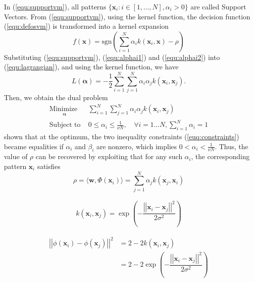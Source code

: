 \documentclass[conference]{IEEEtran}
\theoremstyle{problemstyle}
\begin{document}
In (\ref{equ:supportvm}), all patterns $\{\mathbf{x}_i:i\in[1,\ldots,N], \alpha_i>0\}$ are called Support Vectors. From (\ref{equ:supportvm}), using the kernel function, the decision function (\ref{equ:defosvm}) is transformed into a kernel expansion 
\begin{equation}
\label{equ:defosvmker}
f(\mathbf{x})=\text{sgn}\left(\sum_{i=1}^N\alpha_i k(\mathbf{x}_i, \mathbf{x})- \rho\right)
\end{equation}
Substituting (\ref{equ:supportvm}), (\ref{equ:alphai1}) and (\ref{equ:alphai2}) into (\ref{equ:lagrangian}), and using the kernel function, we have 
\begin{equation}
\label{equ:lagrangianalpha}
L(\boldsymbol{\alpha})=-\frac{1}{2}\sum_{i=1}^N\sum_{j=1}^N \alpha_i\alpha_j k(\mathbf{x}_i, \mathbf{x}_j).
\end{equation}
Then, we obtain the dual problem
\begin{subequations}\label{euq:ocsvmker}
\begin{align}
\underset{
	\begin{array}{c}
		 \mathbf{\alpha}
	\end{array}}{\text{Minimize }} & \sum_{i=1}^N\sum_{j=1}^N \alpha_i\alpha_j k(\mathbf{x}_i, \mathbf{x}_j)\\
\text{Subject to } & 0\leq \alpha_i\leq \frac{1}{\nu N}, \quad \forall i=1\ldots N, \sum_{i=1}^N\alpha_i=1 
\end{align}
\end{subequations}
\cite{scholkopf2001estimating} shown that at the optimum, the two inequality constraints (\ref{euq:constraints}) 
became equalities if $\alpha_i$ and $\beta_i$ are nonzero, which implies $0<\alpha_i<\frac{1}{\nu N}$. Thus, the value of $\rho$
can be recovered by exploiting that for any such $\alpha_i$, the corresponding pattern $ \mathbf{x}_i$ satisfies
\begin{equation}
\label{equ:rho}
\rho=\langle\mathbf{w},\Phi(\mathbf{x}_i)\rangle=\sum_{j=1}^N\alpha_j k(\mathbf{x}_j, \mathbf{x}_i)
\end{equation}

\begin{align}
k \left( \mathbf{x}_i, \mathbf{x}_j\right) = \exp \left( - \dfrac{\left|\left| \mathbf{x}_i - \mathbf{x}_j \right|\right|^2}{2 \sigma^2} \right)
\end{align}

\begin{align}
\left|\left| \phi \left( \mathbf{x}_i \right) - \phi \left( \mathbf{x}_j \right) \right|\right|^2 &= 2 -2 k \left( \mathbf{x}_i, \mathbf{x}_j\right) \nonumber \\
&= 2 - 2 \exp \left( - \dfrac{\left|\left| \mathbf{x}_i - \mathbf{x}_j \right|\right|^2}{2 \sigma^2}  \right)
\end{align}
\end{document}
